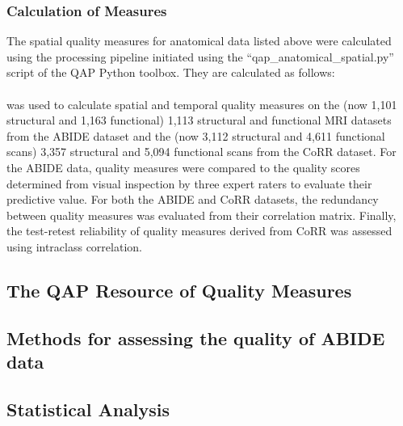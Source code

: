 \subsubsection{Calculation of Measures}
\label{sec:21}
The spatial quality measures for anatomical data listed above were calculated using the processing pipeline initiated using the “qap\_anatomical\_spatial.py” script of the QAP Python toolbox. They are calculated as follows:
\\\\
was used to calculate spatial and temporal quality measures on the (now 1,101 structural and 1,163 functional) 1,113 structural and functional MRI datasets from the ABIDE dataset and the (now 3,112 structural and 4,611 functional scans) 3,357 structural and 5,094 functional scans from the CoRR dataset. For the ABIDE data, quality measures were compared to the quality scores determined from visual inspection by three expert raters to evaluate their predictive value. For both the ABIDE and CoRR datasets, the redundancy between quality measures was evaluated from their correlation matrix. Finally, the test­-retest reliability of quality measures derived from CoRR was assessed using intra­class correlation.
\subsection{The QAP Resource of Quality Measures}
\label{sec:22}
\subsection{Methods for assessing the quality of ABIDE data}
\label{sec:23}
\subsection{Statistical Analysis}
\label{sec:24}
